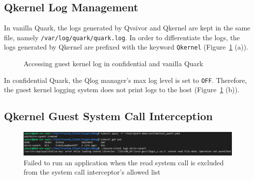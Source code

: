 \subsection{Qkernel Log Management}
\label{sec:eva_qualitativ_secure_log}
In vanilla Quark, the logs generated by Qvsivor and Qkernel are kept in the same file, namely \texttt{/var/log/quark/quark.log}. In order to differentiate the logs,  the logs generated by Qkernel are prefixed with the keyword \texttt{Qkernel} (Figure~\ref{fig:quark_qkernel_log} (a)).
\begin{figure}[!htb]


  
    \caption[Accessing guest kernel log in confidential and vanilla Quark]{Accessing guest kernel log in confidential and vanilla Quark}
    \label{fig:quark_qkernel_log}
\end{figure}


In confidential Quark, the Qlog manager's max log level is set to \texttt{OFF}. Therefore, the guest kernel logging system does not print logs to the host (Figure~\ref{fig:quark_qkernel_log} (b)).

\subsection{Qkernel Guest System Call Interception}
\label{sec:eva_qualitativ_secure_syscall}
\begin{figure}[!htb]
    \centering
    \includegraphics[width=1\textwidth]{images/application_failed_to_start_due_to_syscall_interceptor.png}
    \caption[Failed to run an application when the read system call is excluded from the system call interceptor's allowed list]{Failed to run an application when the read system call is excluded from the system call interceptor's allowed list}
    \label{fig:application_failed_to_start_due_to_syscall_interceptor}
\end{figure}


